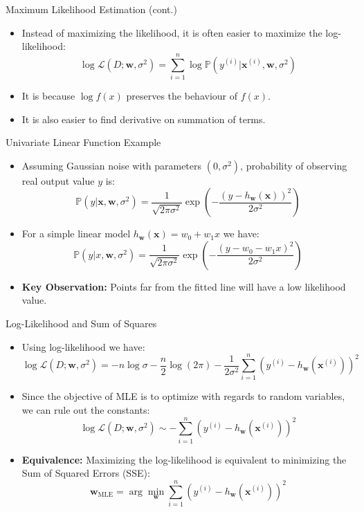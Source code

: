 \documentclass[serif, aspectratio=169]{beamer}
\begin{document}
\begin{frame}{Maximum Likelihood Estimation (cont.)}
    \begin{itemize}
        \item Instead of maximizing the likelihood, it is often easier to maximize the log-likelihood:
        \[
        \log \mathcal{L}(D; \mathbf{w}, \sigma^2) = \sum_{i=1}^n \log  \mathbb{P}(y^{(i)} | \mathbf{x}^{(i)}, \mathbf{w}, \sigma^2)
        \]
        \item It is because \( \log f(x) \) preserves the behaviour of \( f(x) \).
        \item It is also easier to find derivative on summation of terms.
    \end{itemize}
\end{frame}

\begin{frame}{Univariate Linear Function Example}
    \begin{itemize}
        \item Assuming Gaussian noise with parameters \( (0, \sigma^2) \), probability of observing real output value \( y \) is:
        \[
        \mathbb{P}(y | \mathbf{x}, \mathbf{w}, \sigma^2) = \frac{1}{\sqrt{2\pi \sigma^2}} \exp \left( - \frac{(y - h_{\mathbf{w}}(\mathbf{x} ))^2}{2\sigma^2} \right)
        \]

        \item For a simple linear model \( h_{\mathbf{w}}(\mathbf{x} ) = w_0 + w_1 x \) we have:
        \[
        \mathbb{P}(y | x, \mathbf{w}, \sigma^2) = \frac{1}{\sqrt{2\pi \sigma^2}} \exp \left( - \frac{(y - w_0 - w_1 x)^2}{2\sigma^2} \right)
        \]
        \item \textbf{Key Observation:} Points far from the fitted line will have a low likelihood value.
    \end{itemize}
\end{frame}

\begin{frame}{Log-Likelihood and Sum of Squares}
    \begin{itemize}
        \item Using log-likelihood we have:
        \[
        \log \mathcal{L}(D; \mathbf{w}, \sigma^2) = -n \log \sigma - \frac{n}{2} \log(2\pi) - \frac{1}{2\sigma^2} \sum_{i=1}^n (y^{(i)} - h_{\mathbf{w}}(\mathbf{x}^{(i)}))^2
        \]
        \item Since the objective of MLE is to optimize with regards to random variables, we can rule out the constants:
        \[
        \log \mathcal{L}(D; \mathbf{w}, \sigma^2) \sim - \sum_{i=1}^n (y^{(i)} - h_{\mathbf{w}}(\mathbf{x}^{(i)}))^2
        \]
        \item \textbf{Equivalence:} Maximizing the log-likelihood is equivalent to minimizing the Sum of Squared Errors (SSE):
        \[
        \mathbf{w}_{\text{MLE}} = \arg\min_{\mathbf{w}} \sum_{i=1}^n (y^{(i)} - h_{\mathbf{w}}(\mathbf{x}^{(i)}))^2
        \]
    \end{itemize}
\end{frame}
\end{document}
